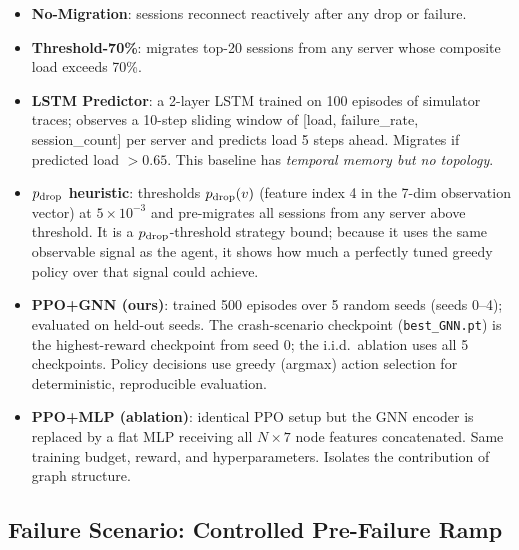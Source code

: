 \documentclass[review,1p]{elsarticle}
\theoremstyle{definition}
\begin{document}
\begin{itemize}
  \item \textbf{No-Migration}: sessions reconnect reactively after
        any drop or failure.
  \item \textbf{Threshold-70\%}: migrates top-20 sessions from any
        server whose composite load exceeds 70\%.
  \item \textbf{LSTM Predictor}: a 2-layer LSTM trained on 100 episodes
        of simulator traces; observes a 10-step sliding window of
        [load, failure\_rate, session\_count] per server and predicts
        load 5 steps ahead. Migrates if predicted load $>0.65$.
        This baseline has \emph{temporal memory but no topology}.
  \item \textbf{$p_{\rm drop}$ heuristic}: thresholds $p_{\rm drop}(v)$ (feature index 4 in
        the 7-dim observation vector) at $5 \times 10^{-3}$ and
        pre-migrates all sessions from any server above threshold.
        It is a $p_{\rm drop}$-threshold strategy bound; because it uses the
        same observable signal as the agent, it shows how much a perfectly
        tuned greedy policy over that signal could achieve.
  \item \textbf{PPO+GNN (ours)}: trained 500 episodes over 5 random seeds (seeds 0--4);
        evaluated on held-out seeds.  The crash-scenario checkpoint
        (\texttt{best\_GNN.pt}) is the highest-reward checkpoint from seed 0;
        the i.i.d.\ ablation uses all 5 checkpoints.
        Policy decisions use greedy (argmax) action selection for
        deterministic, reproducible evaluation.
  \item \textbf{PPO+MLP (ablation)}: identical PPO setup but the GNN
        encoder is replaced by a flat MLP receiving all $N \times 7$
        node features concatenated.  Same training budget, reward, and
        hyperparameters.  Isolates the contribution of graph structure.
\end{itemize}

\subsection{Failure Scenario: Controlled Pre-Failure Ramp}
\label{sec:failure}
\end{document}
